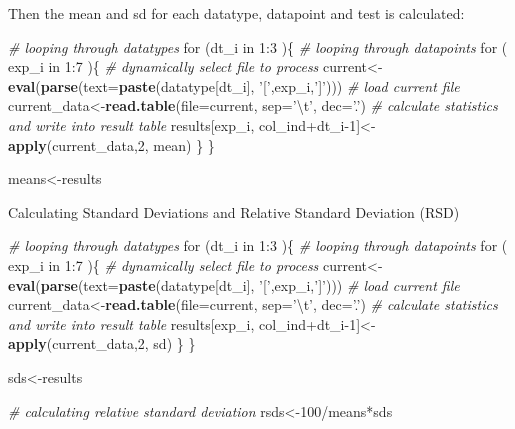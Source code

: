 \documentclass[]{article}
\newenvironment{Shaded}{\begin{snugshade}}{\end{snugshade}}
\newcommand{\KeywordTok}[1]{\textcolor[rgb]{0.13,0.29,0.53}{\textbf{{#1}}}}
\newcommand{\DataTypeTok}[1]{\textcolor[rgb]{0.13,0.29,0.53}{{#1}}}
\newcommand{\DecValTok}[1]{\textcolor[rgb]{0.00,0.00,0.81}{{#1}}}
\newcommand{\CharTok}[1]{\textcolor[rgb]{0.31,0.60,0.02}{{#1}}}
\newcommand{\StringTok}[1]{\textcolor[rgb]{0.31,0.60,0.02}{{#1}}}
\newcommand{\CommentTok}[1]{\textcolor[rgb]{0.56,0.35,0.01}{\textit{{#1}}}}
\newcommand{\NormalTok}[1]{{#1}}
\begin{document}
Then the mean and sd for each datatype, datapoint and test is
calculated:

\begin{Shaded}
\begin{Highlighting}[]
\CommentTok{# looping through datatypes}
\NormalTok{for (dt_i in }\DecValTok{1}\NormalTok{:}\DecValTok{3} \NormalTok{)\{}
    \CommentTok{# looping through datapoints}
    \NormalTok{for ( exp_i in }\DecValTok{1}\NormalTok{:}\DecValTok{7} \NormalTok{)\{}
        \CommentTok{# dynamically select file to process}
        \NormalTok{current<-}\KeywordTok{eval}\NormalTok{(}\KeywordTok{parse}\NormalTok{(}\DataTypeTok{text=}\KeywordTok{paste}\NormalTok{(datatype[dt_i], }\StringTok{'['}\NormalTok{,exp_i,}\StringTok{']'}\NormalTok{)))}
        \CommentTok{# load current file}
        \NormalTok{current_data<-}\KeywordTok{read.table}\NormalTok{(}\DataTypeTok{file=}\NormalTok{current, }\DataTypeTok{sep=}\StringTok{'}\CharTok{\textbackslash{}t}\StringTok{'}\NormalTok{, }\DataTypeTok{dec=}\StringTok{'.'}\NormalTok{)}
        \CommentTok{# calculate statistics and write into result table}
        \NormalTok{results[exp_i, col_ind+dt_i}\DecValTok{-1}\NormalTok{]<-}\KeywordTok{apply}\NormalTok{(current_data,}\DecValTok{2}\NormalTok{, mean)}
    \NormalTok{\}}
\NormalTok{\}}

\NormalTok{means<-results}
\end{Highlighting}
\end{Shaded}

Calculating Standard Deviations and Relative Standard Deviation (RSD)

\begin{Shaded}
\begin{Highlighting}[]
\CommentTok{# looping through datatypes}
\NormalTok{for (dt_i in }\DecValTok{1}\NormalTok{:}\DecValTok{3} \NormalTok{)\{}
    \CommentTok{# looping through datapoints}
    \NormalTok{for ( exp_i in }\DecValTok{1}\NormalTok{:}\DecValTok{7} \NormalTok{)\{}
        \CommentTok{# dynamically select file to process}
        \NormalTok{current<-}\KeywordTok{eval}\NormalTok{(}\KeywordTok{parse}\NormalTok{(}\DataTypeTok{text=}\KeywordTok{paste}\NormalTok{(datatype[dt_i], }\StringTok{'['}\NormalTok{,exp_i,}\StringTok{']'}\NormalTok{)))}
        \CommentTok{# load current file}
        \NormalTok{current_data<-}\KeywordTok{read.table}\NormalTok{(}\DataTypeTok{file=}\NormalTok{current, }\DataTypeTok{sep=}\StringTok{'}\CharTok{\textbackslash{}t}\StringTok{'}\NormalTok{, }\DataTypeTok{dec=}\StringTok{'.'}\NormalTok{)}
        \CommentTok{# calculate statistics and write into result table}
        \NormalTok{results[exp_i, col_ind+dt_i}\DecValTok{-1}\NormalTok{]<-}\KeywordTok{apply}\NormalTok{(current_data,}\DecValTok{2}\NormalTok{, sd)}
    \NormalTok{\}}
\NormalTok{\}}

\NormalTok{sds<-results}

\CommentTok{# calculating relative standard deviation}
\NormalTok{rsds<-}\DecValTok{100}\NormalTok{/means*sds}
\end{Highlighting}
\end{Shaded}
\end{document}
